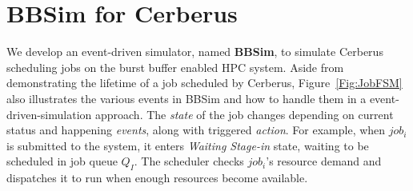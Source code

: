 

\section{BBSim for Cerberus}
\label{Sec:Simulation}

We develop an event-driven simulator, named \textbf{BBSim},
to simulate Cerberus scheduling jobs on the burst buffer enabled HPC system.
Aside from demonstrating the lifetime of a job scheduled by Cerberus, 
Figure~\ref{Fig:JobFSM} also illustrates the various events in BBSim and how to handle
them in a event-driven-simulation approach.
The \textit{state} of the job changes depending on current status and
happening \textit{events}, along with triggered \textit{action}.
For example, when $job_i$ is submitted to the system, 
it enters \textit{Waiting Stage-in} state, 
waiting to be scheduled in job queue $Q_I$. 
The scheduler checks $job_i$'s resource demand and 
dispatches it to run when enough resources become available.


